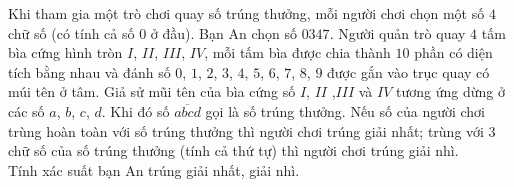 \begin{bt}%
	Khi tham gia một trò chơi quay số trúng thưởng, mỗi người chơi chọn một số $4$ chữ số (có tính cả số $0$ ở đầu). Bạn An chọn số $0347$. Người quản trò quay $4$ tấm bìa cứng hình tròn $I$, $II$, $III$, $IV$, mỗi tấm bìa được chia thành $10$ phần có diện tích bằng nhau và đánh số $0$, $1$, $2$, $3$, $4$, $5$, $6$, $7$, $8$, $9$ được gắn vào trục quay có múi tên ở tâm. Giả sử mũi tên của bìa cứng số $I$, $II$ ,$III$ và $IV$ tương ứng dừng ở các số $a$, $b$, $c$, $d$. Khi đó số $\overline{abcd}$ gọi là số trúng thưởng. Nếu số của người chơi trùng hoàn toàn với số trúng thưởng thì người chơi trúng giải nhất; trùng với $3$ chữ số của số trúng thưởng (tính cả thứ tự) thì người chơi trúng giải nhì.\\
	Tính xác suất bạn An trúng giải nhất, giải nhì.
\end{bt}

